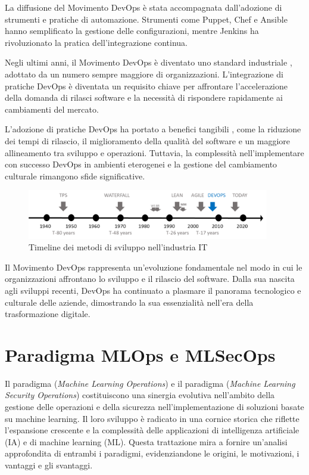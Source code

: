 La diffusione del Movimento DevOps è stata accompagnata dall'adozione di strumenti e pratiche di automazione. Strumenti come Puppet, Chef e Ansible hanno semplificato la gestione delle configurazioni, mentre Jenkins ha rivoluzionato la pratica dell'integrazione continua.

Negli ultimi anni, il Movimento DevOps è diventato uno standard industriale \cite{devops_1}, adottato da un numero sempre maggiore di organizzazioni. L'integrazione di pratiche DevOps è diventata un requisito chiave per affrontare l'accelerazione della domanda di rilasci software e la necessità di rispondere rapidamente ai cambiamenti del mercato.

L'adozione di pratiche DevOps ha portato a benefici tangibili \cite{devops_2}, come la riduzione dei tempi di rilascio, il miglioramento della qualità del software e un maggiore allineamento tra sviluppo e operazioni. Tuttavia, la complessità nell'implementare con successo DevOps in ambienti eterogenei e la gestione del cambiamento culturale rimangono sfide significative.

\begin{figure}[h]
    \centering
    \includegraphics[width=400px]{figures/ch1/devops-timeline.png}
    \caption[Timeline dei metodi di sviluppo nell'industria IT]{Timeline dei metodi di sviluppo nell'industria IT}
    \label{fig:cha1:from_waterfall_to_devops}
\end{figure}

Il Movimento DevOps rappresenta un'evoluzione fondamentale nel modo in cui le organizzazioni affrontano lo sviluppo e il rilascio del software. Dalla sua nascita agli sviluppi recenti, DevOps ha continuato a plasmare il panorama tecnologico e culturale delle aziende, dimostrando la sua essenzialità nell'era della trasformazione digitale.

\section{Paradigma MLOps e MLSecOps}

Il paradigma  ({\em Machine Learning Operations}) e il paradigma  ({\em Machine Learning Security Operations}) costituiscono una sinergia evolutiva nell'ambito della gestione delle operazioni e della sicurezza nell'implementazione di soluzioni basate su machine learning. Il loro sviluppo è radicato in una cornice storica che riflette l'espansione crescente e la complessità delle applicazioni di intelligenza artificiale (IA) e di machine learning (ML). Questa trattazione mira a fornire un'analisi approfondita di entrambi i paradigmi, evidenziandone le origini, le motivazioni, i vantaggi e gli svantaggi.

